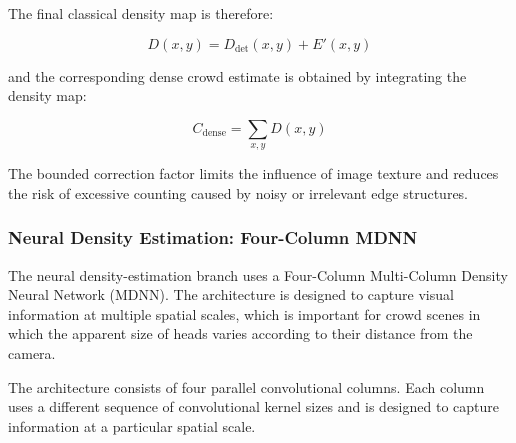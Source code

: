 \documentclass[12pt,a4paper]{report}
\begin{document}
The final classical density map is therefore:

\begin{equation}
D(x,y)
=
D_{\mathrm{det}}(x,y)
+
E'(x,y)
\label{eq:classical-density-map}
\end{equation}

and the corresponding dense crowd estimate is obtained by integrating the
density map:

\begin{equation}
C_{\mathrm{dense}}
=
\sum_{x,y}D(x,y)
\label{eq:classical-dense-count}
\end{equation}

The bounded correction factor limits the influence of image texture and
reduces the risk of excessive counting caused by noisy or irrelevant edge
structures.


\subsubsection{Neural Density Estimation: Four-Column MDNN}

The neural density-estimation branch uses a Four-Column Multi-Column
Density Neural Network (MDNN). The architecture is designed to capture
visual information at multiple spatial scales, which is important for crowd
scenes in which the apparent size of heads varies according to their
distance from the camera.

The architecture consists of four parallel convolutional columns. Each
column uses a different sequence of convolutional kernel sizes and is
designed to capture information at a particular spatial scale.
\end{document}
